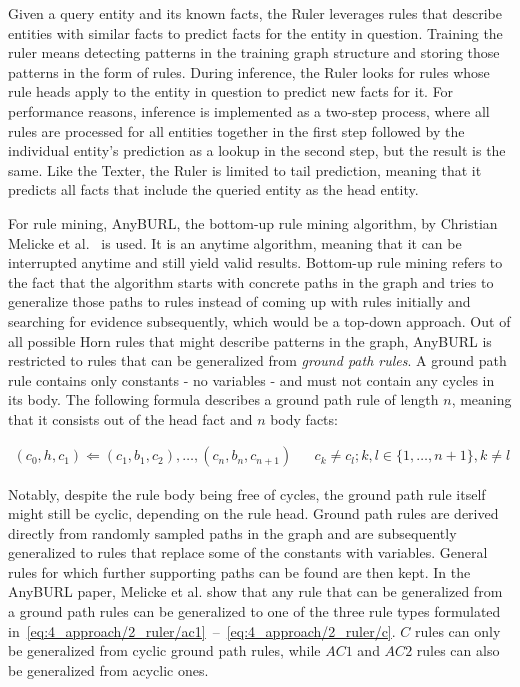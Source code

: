 Given a query entity and its known facts, the Ruler leverages rules that describe entities with similar facts to predict facts for the entity in question. Training the ruler means detecting patterns in the training graph structure and storing those patterns in the form of rules. During inference, the Ruler looks for rules whose rule heads apply to the entity in question to predict new facts for it. For performance reasons, inference is implemented as a two-step process, where all rules are processed for all entities together in the first step followed by the individual entity's prediction as a lookup in the second step, but the result is the same. Like the Texter, the Ruler is limited to tail prediction, meaning that it predicts all facts that include the queried entity as the head entity.

For rule mining, AnyBURL, the bottom-up rule mining algorithm, by Christian Melicke et al.~\cite{Meilicke2019AnytimeBR} is used. It is an anytime algorithm, meaning that it can be interrupted anytime and still yield valid results. Bottom-up rule mining refers to the fact that the algorithm starts with concrete paths in the graph and tries to generalize those paths to rules instead of coming up with rules initially and searching for evidence subsequently, which would be a top-down approach. Out of all possible Horn rules that might describe patterns in the graph, AnyBURL is restricted to rules that can be generalized from \emph{ground path rules}. A ground path rule contains only constants - no variables - and must not contain any cycles in its body. The following formula describes a ground path rule of length $n$, meaning that it consists out of the head fact and $n$ body facts:

\begin{align*}
(c_0, h, c_1)
    \Leftarrow (c_1, b_1, c_2), \dots, (c_n, b_n, c_{n+1}) &&
    c_k \neq c_l; k, l \in \{1, \dots, n+1\}, k \ne l
\end{align*}

Notably, despite the rule body being free of cycles, the ground path rule itself might still be cyclic, depending on the rule head. Ground path rules are derived directly from randomly sampled paths in the graph and are subsequently generalized to rules that replace some of the constants with variables. General rules for which further supporting paths can be found are then kept. In the AnyBURL paper, Melicke et al. show that any rule that can be generalized from a ground path rules can be generalized to one of the three rule types formulated in~\ref{eq:4_approach/2_ruler/ac1}~--~\ref{eq:4_approach/2_ruler/c}. $C$ rules can only be generalized from cyclic ground path rules, while $AC1$ and $AC2$ rules can also be generalized from acyclic ones.


